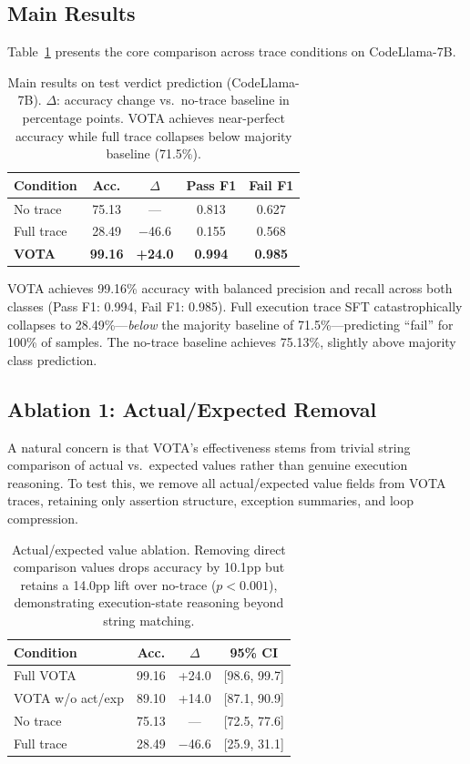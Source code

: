 \documentclass[11pt,a4paper]{article}
\begin{document}
\subsection{Main Results}

Table~\ref{tab:main} presents the core comparison across trace conditions on CodeLlama-7B.

\begin{table}[t]
\centering
\small
\begin{tabular}{lcccc}
\toprule
\textbf{Condition} & \textbf{Acc.} & \textbf{$\Delta$} & \textbf{Pass F1} & \textbf{Fail F1} \\
\midrule
No trace & 75.13 & --- & 0.813 & 0.627 \\
Full trace & 28.49 & $-$46.6 & 0.155 & 0.568 \\
\textbf{VOTA} & \textbf{99.16} & \textbf{+24.0} & \textbf{0.994} & \textbf{0.985} \\
\bottomrule
\end{tabular}
\caption{Main results on test verdict prediction (CodeLlama-7B). $\Delta$: accuracy change vs.\ no-trace baseline in percentage points. VOTA achieves near-perfect accuracy while full trace collapses below majority baseline (71.5\%).}
\label{tab:main}
\end{table}

VOTA achieves 99.16\% accuracy with balanced precision and recall across both classes (Pass F1: 0.994, Fail F1: 0.985). Full execution trace SFT catastrophically collapses to 28.49\%---\emph{below} the majority baseline of 71.5\%---predicting ``fail'' for 100\% of samples. The no-trace baseline achieves 75.13\%, slightly above majority class prediction.

\subsection{Ablation 1: Actual/Expected Removal}
\label{sec:actexp}

A natural concern is that VOTA's effectiveness stems from trivial string comparison of actual vs.\ expected values rather than genuine execution reasoning. To test this, we remove all actual/expected value fields from VOTA traces, retaining only assertion structure, exception summaries, and loop compression.

\begin{table}[t]
\centering
\small
\begin{tabular}{lccc}
\toprule
\textbf{Condition} & \textbf{Acc.} & \textbf{$\Delta$} & \textbf{95\% CI} \\
\midrule
Full VOTA & 99.16 & +24.0 & [98.6, 99.7] \\
VOTA w/o act/exp & 89.10 & +14.0 & [87.1, 90.9] \\
No trace & 75.13 & --- & [72.5, 77.6] \\
Full trace & 28.49 & $-$46.6 & [25.9, 31.1] \\
\bottomrule
\end{tabular}
\caption{Actual/expected value ablation. Removing direct comparison values drops accuracy by 10.1pp but retains a 14.0pp lift over no-trace ($p < 0.001$), demonstrating execution-state reasoning beyond string matching.}
\label{tab:actexp}
\end{table}
\end{document}
